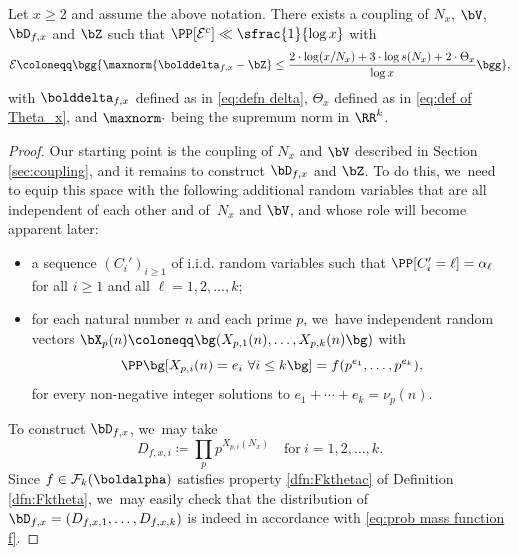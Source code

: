 \begin{lem}
\label{lem:coupling for factorizations}
Let $x\ge2$ and assume the above notation. There exists a coupling of $N_x$, $\bV$, $\bD_{f, x}$ and $\bZ$ such that $\PP[\mathcal E^c] \ll \sfrac{1}{\log x}$ with
\[
\mathcal E \coloneqq \bgg\{\maxnorm{\bolddelta_{f, x} - \bZ} \le \frac{2 \cdot \log(x/N_x) + 3 \cdot \log s(N_x) + 2\cdot \Theta_x}{\log x}\bgg\},
\]
with $\bolddelta_{f, x}$ defined as in \eqref{eq:defn delta}, $\Theta_x$ defined as in \eqref{eq:def of Theta_x}, and $\maxnorm \cdot$ being the supremum norm in $\RR^k$.
\end{lem}

\begin{proof} Our starting point is the coupling of $N_x$ and $\bV$ described in Section \ref{sec:coupling}, and it remains to construct $\bD_{f, x}$ and $\bZ$. To do this, we~need to equip this space with the following additional random variables that are all independent of each other and of~$N_x$ and $\bV$, and whose role will become apparent later:
\begin{itemize}
\item a sequence $(C_i')_{i\ge1}$ of i.i.d. random variables such that $\PP[C_i'=\ell]=\alpha_\ell$ for all $i\ge1$ and all $\ell=1,2,\dots,k$;
\item for each natural number $n$ and each prime $p$, we~have independent random vectors $\bX_{p}(n) \coloneqq \bg(X_{p, 1}(n), \ldots, X_{p, k}(n)\bg)$ with
\[
\PP\bg[X_{p, i}(n) = e_i \ \forall i \le k\bg] = f(p^{e_1}, \ldots, p^{e_k}),
\]
for every non-negative integer solutions to $e_1+\cdots + e_k = \nu_p(n)$.
\end{itemize}

To construct $\bD_{f, x}$, we~may take
\[
D_{f,x,i} \coloneqq \prod_{p} p^{X_{p, i}(N_x)}\quad\text{for}\ i=1,2,\dots,k.
\]
Since $f \in \mathcal F_k(\boldalpha)$ satisfies property \eqref{dfn:Fkthetac} of Definition \ref{dfn:Fktheta}, we~may easily check that the distribution of $\bD_{f, x}=(D_{f,x,1},\dots,D_{f,x,k})$ is indeed in accordance with \eqref{eq:prob mass function f}.


\end{proof}
